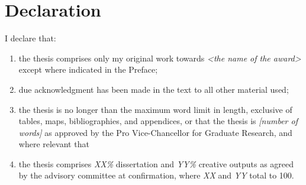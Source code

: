 \chapter*{Declaration}


I declare that:

\begin{enumerate}[label=\roman*.]
    \item the thesis comprises only my original work towards \textit{<the name of the award>} except where indicated in the Preface;
    \item due acknowledgment has been made in the text to all other material used;
    \item the thesis is no longer than the maximum word limit in length, exclusive of tables, maps, bibliographies, and appendices, or that the thesis is \textit{[number of words]} as approved by the Pro Vice-Chancellor for Graduate Research, and where relevant that
    \item the thesis comprises \textit{XX\%} dissertation and \textit{YY\%} creative outputs as agreed by the advisory committee at confirmation, where \textit{XX} and \textit{YY} total to 100.

\end{enumerate}